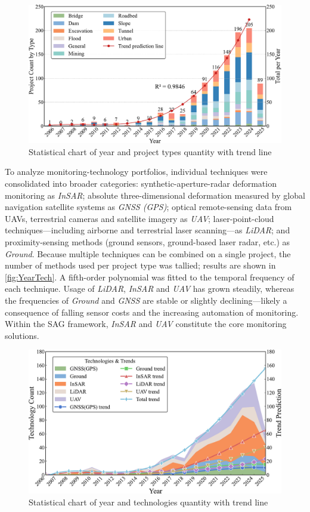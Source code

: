 \documentclass[preprint,11pt,authoryear,3p]{elsarticle}
\begin{document}
\begin{figure}[htbp]
    \centering
    \includegraphics[width=\textwidth]{./imgs/Year_Types.pdf}
    \caption{Statistical chart of year and project types quantity with trend line}
    \label{fig:YearProject}
\end{figure}

To analyze monitoring-technology portfolios, individual techniques were consolidated into broader categories: synthetic-aperture-radar deformation monitoring as \emph{InSAR}; absolute three-dimensional deformation measured by global navigation satellite systems as \emph{GNSS (GPS)}; optical remote-sensing data from UAVs, terrestrial cameras and satellite imagery as \emph{UAV}; laser-point-cloud techniques—including airborne and terrestrial laser scanning—as \emph{LiDAR}; and proximity-sensing methods (ground sensors, ground-based laser radar, etc.) as \emph{Ground}. Because multiple techniques can be combined on a single project, the number of methods used per project type was tallied; results are shown in \autoref{fig:YearTech}. A fifth-order polynomial was fitted to the temporal frequency of each technique. Usage of \emph{LiDAR}, \emph{InSAR} and \emph{UAV} has grown steadily, whereas the frequencies of \emph{Ground} and \emph{GNSS} are stable or slightly declining—likely a consequence of falling sensor costs and the increasing automation of monitoring. Within the SAG framework, \emph{InSAR} and \emph{UAV} constitute the core monitoring solutions.

\begin{figure}[htbp]
    \centering
    \includegraphics[width=\textwidth]{./imgs/Year_Tech.pdf}
    \caption{Statistical chart of year and technologies quantity with trend line}
    \label{fig:YearTech}
\end{figure}
\end{document}
